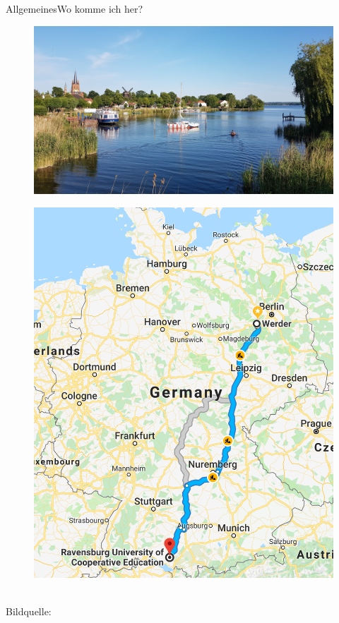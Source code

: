\begin{frame}{Allgemeines}{Wo komme ich her?}
	\begin{minipage}{0.7\textwidth}
	\centering
		\begin{figure}
		\centering
		\includegraphics[width=.95\linewidth]{graph/werder.jpg}
	\end{figure}
	\end{minipage}%
	\begin{minipage}{0.3\textwidth}
	\centering
		\begin{figure}
		\centering
		\includegraphics[width=.95\linewidth]{graph/route2werder}
		\end{figure}
	\end{minipage}
	\\
	\tiny{Bildquelle: \cite{pic:werder}}
\end{frame}

